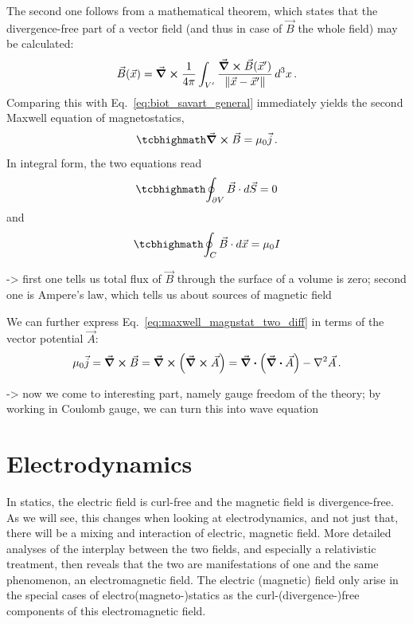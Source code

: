 \documentclass[../class_mech_main.tex]{subfiles}
\begin{document}
The second one follows from a mathematical theorem, which states that the divergence-free part of a vector field (and thus in case of $\vec{B}$ the whole field) may be calculated:
\begin{equation*}
    \vec{B}(\vec{x}) = \curl \frac{1}{4 \pi} \int_{V'} \frac{\curl \vec{B}(\vec{x}')}{\norm{\vec{x} - \vec{x}'}} \, d^3x
    \, .
\end{equation*}
Comparing this with Eq.~\eqref{eq:biot_savart_general} immediately yields the second Maxwell equation of magnetostatics,
\begin{equation}\label{eq:maxwell_magnstat_two_diff}
    \eqbox{
        \curl \vec{B} = \mu_0 \vec{j}
    } \, .
\end{equation}
In integral form, the two equations read
\begin{equation}\label{eq:maxwell_magnstat_one_int}
    \eqbox{
        \oint_{\partial V} \vec{B} \cdot d\vec{S} = 0
    }
\end{equation}
and
\begin{equation}\label{eq:maxwell_magnstat_two_int}
    \eqbox{
        \oint_{C} \vec{B} \cdot d\vec{x} = \mu_0 I
    }
\end{equation}

-> first one tells us total flux of $\vec{B}$ through the surface of a volume is zero; second one is Ampere's law, which tells us about sources of magnetic field


We can further express Eq.~\eqref{eq:maxwell_magnstat_two_diff} in terms of the vector potential $\vec{A}$:
\begin{equation}
    \mu_0 \vec{j} = \curl \vec{B} = \curl \qty(\curl \vec{A}) = \div \qty(\div \vec{A}) - \laplacian \vec{A}
    \, .
\end{equation}

-> now we come to interesting part, namely gauge freedom of the theory; by working in Coulomb gauge, we can turn this into wave equation



    \section{Electrodynamics}
In statics, the electric field is curl-free and the magnetic field is divergence-free. As we will see, this changes when looking at electrodynamics, and not just that, there will be a mixing and interaction of electric, magnetic field. More detailed analyses of the interplay between the two fields, and especially a relativistic treatment, then reveals that the two are manifestations of one and the same phenomenon, an electromagnetic field. The electric (magnetic) field only arise in the special cases of electro(magneto-)statics as the curl-(divergence-)free components of this electromagnetic field.
\end{document}
